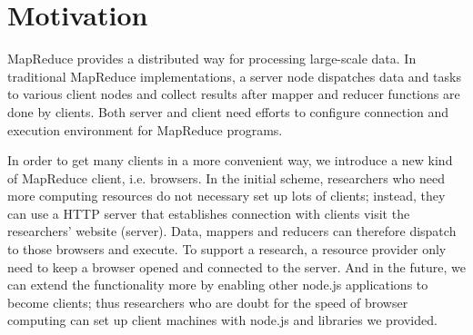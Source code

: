 \section{Motivation}
\label{ch2}

MapReduce provides a distributed way for processing large-scale data. In traditional MapReduce implementations, a server node dispatches data and tasks to various client nodes and collect results after mapper and reducer functions are done by clients. Both server and client need efforts to configure connection and execution environment for MapReduce programs.

In order to get many clients in a more convenient way, we introduce a new kind of MapReduce client, i.e. browsers. In the initial scheme, researchers who need more computing resources do not necessary set up lots of clients; instead, they can use a HTTP server that establishes connection with clients visit the researchers’ website (server).
Data, mappers and reducers can therefore dispatch to those browsers and execute. To support a research, a resource provider only need to keep a browser opened and connected to the server.
And in the future, we can extend the functionality more by enabling other node.js applications to become clients; thus researchers who are doubt for the speed of browser computing can set up client machines with node.js and libraries we provided.